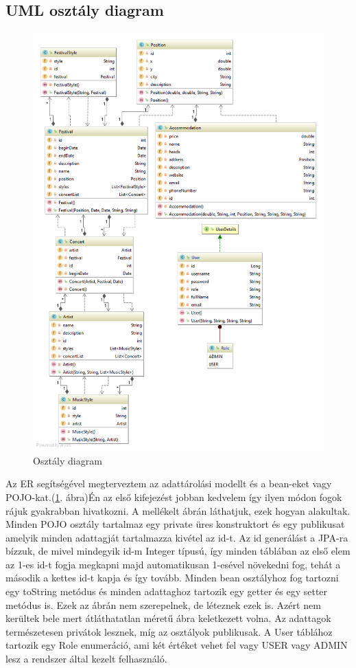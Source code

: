 \subsection{UML osztály diagram}

\begin{figure}
\centering
\includegraphics[scale=0.56]{kepek/uml.png}
\caption{Osztály diagram}
\label{fig:umlclass}
\end{figure}

Az ER segítségével megterveztem az adattárolási modellt és a bean-eket vagy POJO-kat.(\ref{fig:umlclass}. ábra)Én az első kifejezést jobban kedvelem így ilyen módon fogok rájuk gyakrabban hivatkozni. A mellékelt ábrán láthatjuk, ezek hogyan alakultak. Minden POJO osztály tartalmaz egy private üres konstruktort és egy publikusat amelyik minden adattagját tartalmazza kivétel az id-t. Az id generálást a JPA-ra bízzuk, de mivel mindegyik id-m Integer típusú, így minden táblában az első elem az 1-es id-t fogja megkapni majd automatikusan 1-esével növekedni fog, tehát a második a kettes id-t kapja és így tovább. Minden bean osztályhoz fog tartozni egy toString metódus és minden adattaghoz tartozik egy getter és egy setter metódus is.  Ezek az ábrán nem szerepelnek, de léteznek ezek is. Azért nem kerültek bele mert átláthatatlan méretű ábra keletkezett volna. Az adattagok természetesen privátok lesznek, míg az osztályok publikusak. A User táblához tartozik egy Role enumeráció, ami két értéket vehet fel vagy USER vagy ADMIN lesz a rendszer által kezelt felhasználó.

